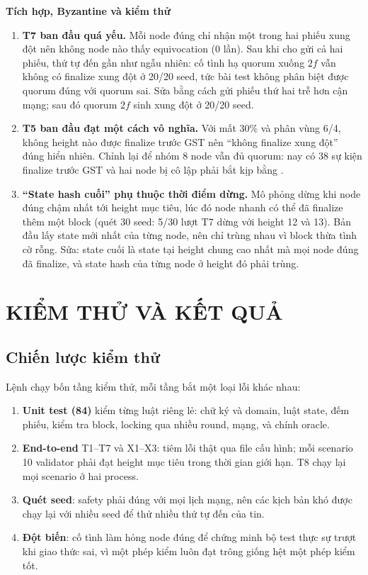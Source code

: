 \documentclass[a4paper,12pt]{article}
\newcommand{\code}[1]{\texttt{\detokenize{#1}}}
\begin{document}
\textbf{Tích hợp, Byzantine và kiểm thử}
\begin{enumerate}[resume*=bugs]
\item \textbf{T7 ban đầu quá yếu.} Mỗi node đúng chỉ nhận một trong hai phiếu xung đột nên không node nào
thấy equivocation (0 lần). Sau khi cho gửi cả hai phiếu, thứ tự đến gần như ngẫu nhiên: cố tình hạ quorum
xuống $2f$ vẫn không có finalize xung đột ở 20/20 seed, tức bài test không phân biệt được quorum đúng với
quorum sai. Sửa bằng cách gửi phiếu thứ hai trễ hơn cận mạng; sau đó quorum $2f$ sinh xung đột ở 20/20 seed.
\item \textbf{T5 ban đầu đạt một cách vô nghĩa.} Với mất 30\% và phân vùng 6/4, không height nào được
finalize trước GST nên ``không finalize xung đột'' đúng hiển nhiên. Chỉnh lại để nhóm 8 node vẫn đủ quorum:
nay có 38 sự kiện finalize trước GST và hai node bị cô lập phải bắt kịp bằng \code{COMMIT}.
\item \textbf{``State hash cuối'' phụ thuộc thời điểm dừng.} Mô phỏng dừng khi node đúng chậm nhất tới
height mục tiêu, lúc đó node nhanh có thể đã finalize thêm một block (quét 30 seed: 5/30 lượt T7 dừng với
height 12 và 13). Bản đầu lấy state mới nhất của từng node, nên chỉ trùng nhau vì block thừa tình cờ rỗng.
Sửa: state cuối là state tại height chung cao nhất mà mọi node đúng đã finalize, và state hash của từng node
ở height đó phải trùng.
\end{enumerate}

\section{KIỂM THỬ VÀ KẾT QUẢ}
\subsection{Chiến lược kiểm thử}
Lệnh \code{python -m tests.run_all} chạy bốn tầng kiểm thử, mỗi tầng bắt một loại lỗi khác nhau:
\begin{enumerate}
\item \textbf{Unit test (84)} kiểm từng luật riêng lẻ: chữ ký và domain, luật state, đếm phiếu, kiểm tra
block, locking qua nhiều round, mạng, và chính oracle.
\item \textbf{End-to-end} T1--T7 và X1--X3: tiêm lỗi thật qua file cấu hình; mỗi scenario 10 validator phải
đạt height mục tiêu trong thời gian giới hạn. T8 chạy lại mọi scenario ở hai process.
\item \textbf{Quét seed}: safety phải đúng với mọi lịch mạng, nên các kịch bản khó được chạy lại với nhiều
seed để thử nhiều thứ tự đến của tin.
\item \textbf{Đột biến}: cố tình làm hỏng node đúng để chứng minh bộ test thực sự trượt khi giao thức sai,
vì một phép kiểm luôn đạt trông giống hệt một phép kiểm tốt.
\end{enumerate}
\end{document}
